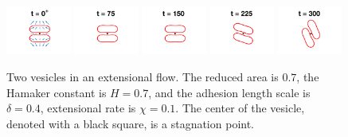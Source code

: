 \documentclass[prf,superscriptaddress,showpacs]{revtex4-1}
\begin{document}
 
\begin{figure}[htp]
  \includegraphics[width = 0.19\textwidth,trim={5cm 2cm 5cm 1cm},clip]{figs/extensional_adR4em1adS7em1Chi1em1_ra070_image01.png}
  \includegraphics[width = 0.19\textwidth,trim={5cm 2cm 5cm 1cm},clip]{figs/extensional_adR4em1adS7em1Chi1em1_ra070_image02.png}
  \includegraphics[width = 0.19\textwidth,trim={5cm 2cm 5cm 1cm},clip]{figs/extensional_adR4em1adS7em1Chi1em1_ra070_image03.png}
  \includegraphics[width = 0.19\textwidth,trim={5cm 2cm 5cm 1cm},clip]{figs/extensional_adR4em1adS7em1Chi1em1_ra070_image04.png}
  \includegraphics[width = 0.19\textwidth,trim={5cm 2cm 5cm 1cm},clip]{figs/extensional_adR4em1adS7em1Chi1em1_ra070_image05.png}
  \caption{\label{fig:extensional4} Two vesicles in an extensional flow.
  The reduced area is $0.7$, the Hamaker constant is $H = 0.7$, and the
  adhesion length scale is $\delta = 0.4$, extensional rate is $\chi =
  0.1$.  The center of the vesicle, denoted with a black square, is a
  stagnation point.}
\end{figure}
\end{document}
